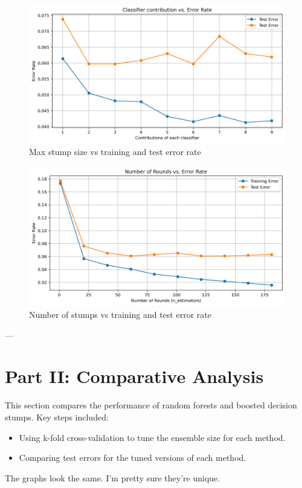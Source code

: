 \documentclass[12pt]{article}
\begin{document}
\begin{figure}[h!]
    \centering
    \includegraphics[width=0.8\linewidth]{figures/Boosted Trees/learn_rate_vs_error.png}
    \caption{Max stump size vs training and test error rate}
    \label{fig:mcc}
\end{figure}

\begin{figure}[h!]
    \centering
    \includegraphics[width=0.8\linewidth]{figures/Boosted Trees/round_vs_error.png}
    \caption{Number of stumps vs training and test error rate}
    \label{fig:mcc}
\end{figure}
---

\section{Part II: Comparative Analysis}
This section compares the performance of random forests and boosted decision stumps. Key steps included:
\begin{itemize}
    \item Using k-fold cross-validation to tune the ensemble size for each method.
    \item Comparing test errors for the tuned versions of each method.
\end{itemize}
The graphs look the same. I'm pretty sure they're unique.
\end{document}
